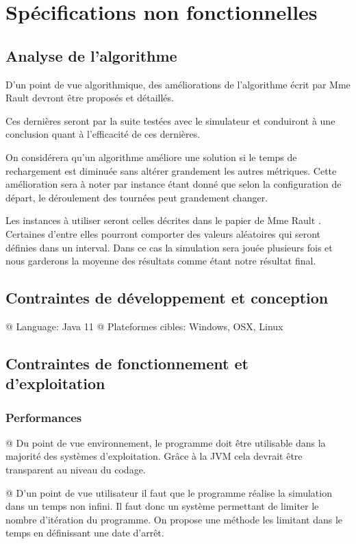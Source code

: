 \documentclass[noposter,final]{polytech/polytech}
\begin{document}
\chapter{Spécifications non fonctionnelles}
	\section{Analyse de l'algorithme}
		D'un point de vue algorithmique, des améliorations de l'algorithme écrit par Mme Rault \cite{Rault:chargers} devront être proposés et détaillés.
			
		Ces dernières seront par la suite testées avec le simulateur et conduiront à une conclusion quant à l'efficacité de ces dernières.
		
		On considérera qu'un algorithme améliore une solution si le temps de rechargement est diminuée sans altérer grandement les autres métriques.
		Cette amélioration sera à noter par instance étant donné que selon la configuration de départ, le déroulement des tournées peut grandement changer.
		
		Les instances à utiliser seront celles décrites dans le papier de Mme Rault \cite{Rault:chargers}.
		Certaines d'entre elles pourront comporter des valeurs aléatoires qui seront définies dans un interval.
		Dans ce cas la simulation sera jouée plusieurs fois et nous garderons la moyenne des résultats comme étant notre résultat final.

	\section{Contraintes de développement et conception}
		\begin{easylist}[itemize]
			@ Language: Java 11
			@ Plateformes cibles: Windows, OSX, Linux
		\end{easylist}
		
	\section{Contraintes de fonctionnement et d'exploitation}
		\subsection{Performances}
			\begin{easylist}
				@ Du point de vue environnement, le programme doit être utilisable dans la majorité des systèmes d'exploitation.
				Grâce à la JVM cela devrait être transparent au niveau du codage.
			
				@ D'un point de vue utilisateur il faut que le programme réalise la simulation dans un temps non infini.
				Il faut donc un système permettant de limiter le nombre d'itération du programme.
				On propose une méthode les limitant dans le temps en définissant une date d'arrêt.
			\end{easylist}
			
\end{document}
